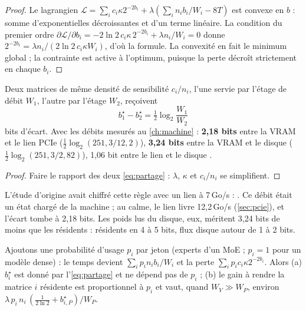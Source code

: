 \begin{proof}
Le lagrangien $\mathcal L = \sum_i c_i \kappa 2^{-2b_i} + \lambda(\sum_i n_i b_i/W_i - 8T)$ est convexe en $b$ : somme d'exponentielles décroissantes et d'un terme linéaire. La condition du premier ordre $\partial\mathcal L/\partial b_i = -2\ln 2\, c_i\kappa\, 2^{-2b_i} + \lambda n_i / W_i = 0$ donne $2^{-2b_i} = \lambda n_i / (2\ln2\, c_i \kappa W_i)$, d'où la formule. La convexité en fait le minimum global ; la contrainte est active à l'optimum, puisque la perte décroît strictement en chaque $b_i$.
\end{proof}

\begin{corollaire}\label{cor:regle-bits}
Deux matrices de même densité de sensibilité $c_i/n_i$, l'une servie par l'étage de débit $W_1$, l'autre par l'étage $W_2$, reçoivent
\begin{equation}\label{eq:regle-bits}
b_1^\star - b_2^\star = \tfrac12 \log_2 \frac{W_1}{W_2}
\end{equation}
bits d'écart. Avec les débits mesurés au \cref{ch:machine} : \textbf{2,18 bits} entre la VRAM et le lien PCIe ($\tfrac12\log_2(251{,}3/12{,}2)$), \textbf{3,24 bits} entre la VRAM et le disque ($\tfrac12\log_2(251{,}3/2{,}82)$), 1,06 bit entre le lien et le disque \calc.
\end{corollaire}

\begin{proof}
Faire le rapport des deux \cref{eq:partage} : $\lambda$, $\kappa$ et $c_i/n_i$ se simplifient.
\end{proof}

\noindent L'étude d'origine avait chiffré cette règle avec un lien à 7\,Go/s : . Ce débit était un état chargé de la machine ; au calme, le lien livre 12,2\,Go/s (\cref{sec:pcie}), et l'écart tombe à 2,18 bits. Les poids lus du disque, eux, méritent 3,24 bits de moins que les résidents : résidents en 4 à 5 bits, flux disque autour de 1 à 2 bits.

\begin{proposition}\label{prop:frequence}
Ajoutons une probabilité d'usage $p_i$ par jeton (experts d'un MoE ; $p_i = 1$ pour un modèle dense) : le temps devient $\sum_i p_i n_i b_i/W_i$ et la perte $\sum_i p_i c_i \kappa 2^{-2b_i}$. Alors (a) $b_i^\star$ est donné par l'\cref{eq:partage} et ne dépend pas de $p_i$ ; (b) le gain à rendre la matrice $i$ résidente est proportionnel à $p_i$ et vaut, quand $W_V \gg W_P$, environ $\lambda\, p_i\, n_i\, (\tfrac{1}{2\ln 2} + b^\star_{i,P})/W_P$.
\end{proposition}

